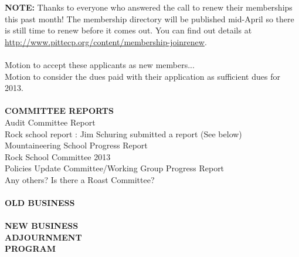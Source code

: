 \documentclass[10pt,a4paper]{article}
\begin{document}
\begin{multicols}{2}
\textbf{NOTE:} Thanks to everyone who answered the call to renew their memberships this past month! The membership directory will be published mid-April so there is still time to renew before it comes out. You can find out details at \url{http://www.pittecp.org/content/membership-joinrenew}. 
\\
\\
Motion to accept these applicants as new members...\\
Motion to consider the dues paid with their application as sufficient dues for 2013.
\\
\\
\textbf{COMMITTEE REPORTS}\\
Audit Committee Report \\
Rock school report : Jim Schuring submitted a report (See below)\\
Mountaineering School Progress Report\\
Rock School Committee 2013\\
Policies Update Committee/Working Group Progress Report \\
Any others?  Is there a Roast Committee? 
\\
\\
\textbf{OLD BUSINESS}
\\
\\
\textbf{NEW BUSINESS}
\\
\textbf{ADJOURNMENT}\\
\textbf{PROGRAM}


\end{multicols}
\end{document}
